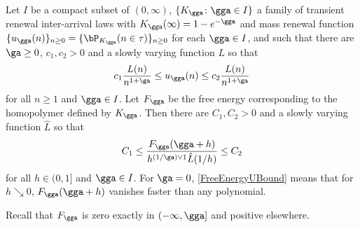 \begin{lemm}\label{FreeEnergyU}
Let $I$ be a compact subset of $(0,\infty)$, $\{K_\gga \colon \gga \in I\}$ a family of transient renewal inter-arrival laws with $K_\gga(\infty) = 1 - e^{- \gga}$ and mass renewal function $\{u_\gga(n)\}_{n\ge 0} = \{\bP_{K_\gga}(n\in\tau)\}_{n\ge 0}$ for each $\gga \in I$, and such that there are $\ga \geq 0$, $c_1,c_2 > 0$ and a slowly varying function $L$ so that
\begin{equation}\label{ReturnTimeUBound}
c_1 \frac{L(n)}{n^{1 + \ga}} \leq u_\gga(n) \leq c_2 \frac{L(n)}{n^{1 + \ga}}
\end{equation}
for all $n \geq 1$ and $\gga \in I$. Let $F_\gga$ be the free energy corresponding to the homopolymer defined by $K_\gga$. Then there are $C_1,C_2 > 0$ and a slowly varying function $\hat L$ so that
\begin{equation}\label{FreeEnergyUBound}
C_1 \leq \frac{F_\gga(\gga + h)}{h^{(1/\ga) \vee 1} \hat L(1/h)} \leq C_2
\end{equation}
for all $h \in (0,1]$ and $\gga \in I$. For $\ga = 0$, \eqref{FreeEnergyUBound} means that for $h \searrow 0$, $F_\gga(\gga + h)$ vanishes faster than any polynomial.
\end{lemm}

Recall that $F_\gga$ is zero exactly in $(- \infty,\gga]$ and positive elsewhere.

